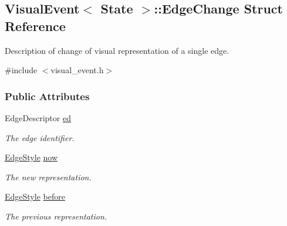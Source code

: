 \hypertarget{structVisualEvent_1_1EdgeChange}{}\subsection{Visual\+Event$<$ State $>$\+:\+:Edge\+Change Struct Reference}
\label{structVisualEvent_1_1EdgeChange}


Description of change of visual representation of a single edge.  




{\ttfamily \#include $<$visual\+\_\+event.\+h$>$}

\subsubsection*{Public Attributes}
\begin{DoxyCompactItemize}
\item 
Edge\+Descriptor \hyperlink{structVisualEvent_1_1EdgeChange_a303545646b36eeee85cc3019792e91f2}{ed}\hypertarget{structVisualEvent_1_1EdgeChange_a303545646b36eeee85cc3019792e91f2}{}\label{structVisualEvent_1_1EdgeChange_a303545646b36eeee85cc3019792e91f2}

\begin{DoxyCompactList}\small\item\em The edge identifier. \end{DoxyCompactList}\item 
\hyperlink{structVisualEvent_ab4aa8ae73e19b337c7f23b39ff9acabf}{Edge\+Style} \hyperlink{structVisualEvent_1_1EdgeChange_a772b1a604c0d5c7ef61b40ea68b60ec8}{now}\hypertarget{structVisualEvent_1_1EdgeChange_a772b1a604c0d5c7ef61b40ea68b60ec8}{}\label{structVisualEvent_1_1EdgeChange_a772b1a604c0d5c7ef61b40ea68b60ec8}

\begin{DoxyCompactList}\small\item\em The new representation. \end{DoxyCompactList}\item 
\hyperlink{structVisualEvent_ab4aa8ae73e19b337c7f23b39ff9acabf}{Edge\+Style} \hyperlink{structVisualEvent_1_1EdgeChange_acaf3f6c954467b0e943f9c04ac332911}{before}\hypertarget{structVisualEvent_1_1EdgeChange_acaf3f6c954467b0e943f9c04ac332911}{}\label{structVisualEvent_1_1EdgeChange_acaf3f6c954467b0e943f9c04ac332911}

\begin{DoxyCompactList}\small\item\em The previous representation. \end{DoxyCompactList}\end{DoxyCompactItemize}


